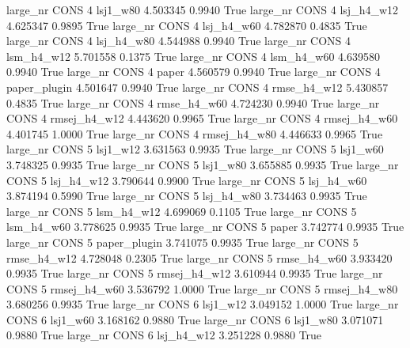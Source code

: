   large_nr     CONS                 4     lsj1_w80    4.503345      0.9940    True
  large_nr     CONS                 4   lsj_h4_w12    4.625347      0.9895    True
  large_nr     CONS                 4   lsj_h4_w60    4.782870      0.4835    True
  large_nr     CONS                 4   lsj_h4_w80    4.544988      0.9940    True
  large_nr     CONS                 4   lsm_h4_w12    5.701558      0.1375    True
  large_nr     CONS                 4   lsm_h4_w60    4.639580      0.9940    True
  large_nr     CONS                 4        paper    4.560579      0.9940    True
  large_nr     CONS                 4 paper_plugin    4.501647      0.9940    True
  large_nr     CONS                 4  rmse_h4_w12    5.430857      0.4835    True
  large_nr     CONS                 4  rmse_h4_w60    4.724230      0.9940    True
  large_nr     CONS                 4 rmsej_h4_w12    4.443620      0.9965    True
  large_nr     CONS                 4 rmsej_h4_w60    4.401745      1.0000    True
  large_nr     CONS                 4 rmsej_h4_w80    4.446633      0.9965    True
  large_nr     CONS                 5     lsj1_w12    3.631563      0.9935    True
  large_nr     CONS                 5     lsj1_w60    3.748325      0.9935    True
  large_nr     CONS                 5     lsj1_w80    3.655885      0.9935    True
  large_nr     CONS                 5   lsj_h4_w12    3.790644      0.9900    True
  large_nr     CONS                 5   lsj_h4_w60    3.874194      0.5990    True
  large_nr     CONS                 5   lsj_h4_w80    3.734463      0.9935    True
  large_nr     CONS                 5   lsm_h4_w12    4.699069      0.1105    True
  large_nr     CONS                 5   lsm_h4_w60    3.778625      0.9935    True
  large_nr     CONS                 5        paper    3.742774      0.9935    True
  large_nr     CONS                 5 paper_plugin    3.741075      0.9935    True
  large_nr     CONS                 5  rmse_h4_w12    4.728048      0.2305    True
  large_nr     CONS                 5  rmse_h4_w60    3.933420      0.9935    True
  large_nr     CONS                 5 rmsej_h4_w12    3.610944      0.9935    True
  large_nr     CONS                 5 rmsej_h4_w60    3.536792      1.0000    True
  large_nr     CONS                 5 rmsej_h4_w80    3.680256      0.9935    True
  large_nr     CONS                 6     lsj1_w12    3.049152      1.0000    True
  large_nr     CONS                 6     lsj1_w60    3.168162      0.9880    True
  large_nr     CONS                 6     lsj1_w80    3.071071      0.9880    True
  large_nr     CONS                 6   lsj_h4_w12    3.251228      0.9880    True
